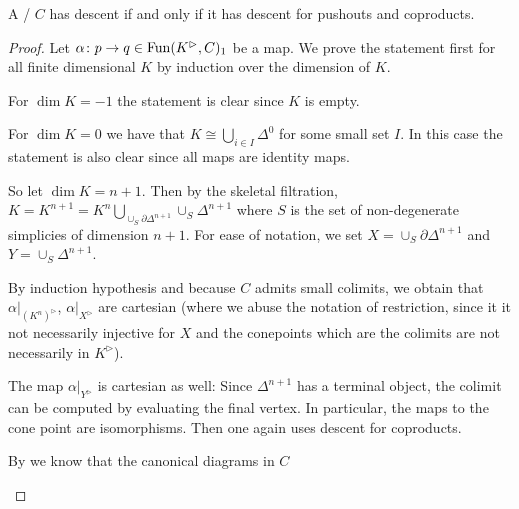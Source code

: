 \begin{lemma}
    A \inftycat/ $C$ has descent if and only if it has descent for pushouts and coproducts. %
    \begin{proof} %
        Let $\alpha\colon p\to q\in\operatorname{Fun}(K^{\rhd},C)_1$ be a map.
        We prove the statement first for all finite dimensional $K$ by induction over the dimension of $K$. %

        For $\dim K=-1$ the statement is clear since $K$ is empty.

        For $\dim K=0$ we have that $K\cong\bigcup\limits_{i\in I}\Delta^0$ for some small set $I$. 
        In this case the statement is also clear since all maps are identity maps.

        So let $\dim K=n+1$.
        Then by the skeletal filtration, $K=K^{n+1}=K^n\bigcup\limits_{\cup_S \partial\Delta^{n+1}}\cup_S \Delta^{n+1}$ where $S$ is the set of non-degenerate simplicies of dimension $n+1$.
        For ease of notation, we set $X=\cup_S \partial\Delta^{n+1}$ and $Y=\cup_S \Delta^{n+1}$.

        By induction hypothesis and because $C$ admits small colimits, we obtain that $\alpha|_{\left(K^n\right)^{\rhd}}$, $\alpha|_{X^{\rhd}}$ are cartesian (where we abuse the notation of restriction, since it it not necessarily injective for $X$ and the conepoints which are the colimits are not necessarily in $K^{\rhd}$).

        The map $\alpha|_{Y^{\rhd}}$ is cartesian as well: Since $\Delta^{n+1}$ has a terminal object, the colimit can be computed by evaluating the final vertex. 
        In particular, the maps to the cone point are isomorphisms.
        Then one again uses descent for coproducts.

        By %
        we know that the canonical diagrams in $C$
        \begin{center}
\end{center}
\end{proof}
\end{lemma}
